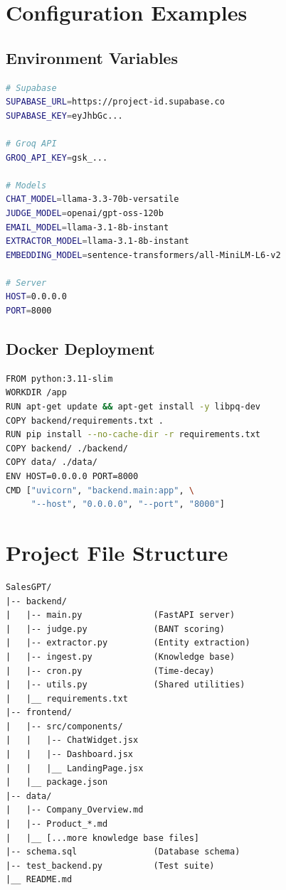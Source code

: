 \documentclass[10pt,twocolumn,a4paper]{article}
\begin{document}

\appendix

\section{Configuration Examples}

\subsection{Environment Variables}

\begin{lstlisting}[language=bash]
# Supabase
SUPABASE_URL=https://project-id.supabase.co
SUPABASE_KEY=eyJhbGc...

# Groq API
GROQ_API_KEY=gsk_...

# Models
CHAT_MODEL=llama-3.3-70b-versatile
JUDGE_MODEL=openai/gpt-oss-120b
EMAIL_MODEL=llama-3.1-8b-instant
EXTRACTOR_MODEL=llama-3.1-8b-instant
EMBEDDING_MODEL=sentence-transformers/all-MiniLM-L6-v2

# Server
HOST=0.0.0.0
PORT=8000
\end{lstlisting}

\subsection{Docker Deployment}

\begin{lstlisting}[language=bash]
FROM python:3.11-slim
WORKDIR /app
RUN apt-get update && apt-get install -y libpq-dev
COPY backend/requirements.txt .
RUN pip install --no-cache-dir -r requirements.txt
COPY backend/ ./backend/
COPY data/ ./data/
ENV HOST=0.0.0.0 PORT=8000
CMD ["uvicorn", "backend.main:app", \
     "--host", "0.0.0.0", "--port", "8000"]
\end{lstlisting}

\section{Project File Structure}

\begin{verbatim}
SalesGPT/
|-- backend/
|   |-- main.py              (FastAPI server)
|   |-- judge.py             (BANT scoring)
|   |-- extractor.py         (Entity extraction)
|   |-- ingest.py            (Knowledge base)
|   |-- cron.py              (Time-decay)
|   |-- utils.py             (Shared utilities)
|   |__ requirements.txt
|-- frontend/
|   |-- src/components/
|   |   |-- ChatWidget.jsx
|   |   |-- Dashboard.jsx
|   |   |__ LandingPage.jsx
|   |__ package.json
|-- data/
|   |-- Company_Overview.md
|   |-- Product_*.md
|   |__ [...more knowledge base files]
|-- schema.sql               (Database schema)
|-- test_backend.py          (Test suite)
|__ README.md
\end{verbatim}
\end{document}
